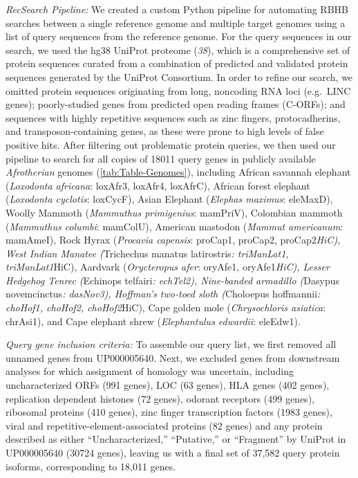 \documentclass[]{elsarticle} %
\begin{document}
\emph{RecSearch Pipeline:} We created a custom Python pipeline for automating RBHB searches between a single reference genome and multiple target genomes using a list of query sequences from the reference genome. For the query sequences in our search, we used the hg38 UniProt proteome (\emph{38}), which is a comprehensive set of protein sequences curated from a combination of predicted and validated protein sequences generated by the UniProt Consortium. In order to refine our search, we omitted protein sequences originating from long, noncoding RNA loci (e.g.~LINC genes); poorly-studied genes from predicted open reading frames (C-ORFs); and sequences with highly repetitive sequences such as zinc fingers, protocadherins, and transposon-containing genes, as these were prone to high levels of false positive hits.
After filtering out problematic protein queries, we then used our pipeline to search for all copies of 18011 query genes in publicly available \emph{Afrotherian} genomes (\ref{tab:Table-Genomes}), including African savannah elephant (\emph{Loxodonta africana}: loxAfr3, loxAfr4, loxAfrC), African forest elephant (\emph{Loxodonta cyclotis}: loxCycF), Asian Elephant (\emph{Elephas maximus}: eleMaxD), Woolly Mammoth (\emph{Mammuthus primigenius}: mamPriV), Colombian mammoth (\emph{Mammuthus columbi}: mamColU), American mastodon (\emph{Mammut americanum}: mamAmeI), Rock Hyrax (\emph{Procavia capensis}: proCap1, proCap2, proCap2\emph{HiC), West Indian Manatee (}Trichechus manatus latirostris\emph{: triManLat1, triManLat1}HiC), Aardvark (\emph{Orycteropus afer}: oryAfe1, oryAfe1\emph{HiC), Lesser Hedgehog Tenrec (}Echinops telfairi\emph{: echTel2), Nine-banded armadillo (}Dasypus novemcinctus\emph{: dasNov3), Hoffman's two-toed sloth (}Choloepus hoffmannii\emph{: choHof1, choHof2, choHof2}HiC), Cape golden mole (\emph{Chrysochloris asiatica}: chrAsi1), and Cape elephant shrew (\emph{Elephantulus edwardii}: eleEdw1).

\emph{Query gene inclusion criteria:} To assemble our query list, we first removed all unnamed genes from UP000005640. Next, we excluded genes from downstream analyses for which assignment of homology was uncertain, including uncharacterized ORFs (991 genes), LOC (63 genes), HLA genes (402 genes), replication dependent histones (72 genes), odorant receptors (499 genes), ribosomal proteins (410 genes), zinc finger transcription factors (1983 genes), viral and repetitive-element-associated proteins (82 genes) and any protein described as either ``Uncharacterized,'' ``Putative,'' or ``Fragment'' by UniProt in UP000005640 (30724 genes), leaving us with a final set of 37,582 query protein isoforms, corresponding to 18,011 genes.
\end{document}
